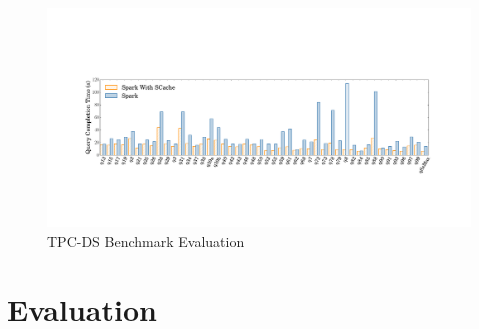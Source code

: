 \begin{figure}
	\centering
	\includegraphics[width=.8\textwidth]{fig/tpcds}
	\caption{TPC-DS Benchmark Evaluation}
	\label{fig:tpcds}
	\vspace{-1em}
\end{figure}

\section{Evaluation}\label{evaluation}

